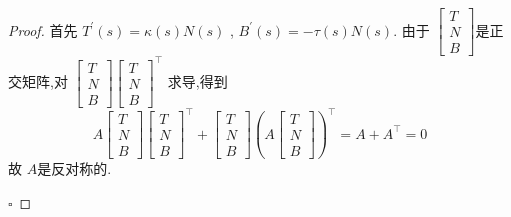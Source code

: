 \documentclass[../../古典微分几何.tex]{subfiles}
\begin{document}
\begin{proof}
    首先 \(   T^{\prime} \left( s \right)     =   \kappa  \left( s \right)N\left( s \right)  \) ,
    \(  B^{\prime} \left( s \right)=  -\tau \left( s \right)N\left( s \right)    \). 
    由于 \(\begin{bmatrix} 
        T\\ 
         N\\ 
          B 
    \end{bmatrix} \)是正交矩阵,对 \(  \begin{bmatrix} 
        T\\ 
         N\\ 
          B 
    \end{bmatrix} \begin{bmatrix} 
        T\\ 
         N\\ 
          B 
    \end{bmatrix}^{\top}    \) 求导,得到 \[
    A \begin{bmatrix} 
        T\\ 
         N\\ 
          B 
    \end{bmatrix} \begin{bmatrix} 
        T\\ 
         N\\ 
          B 
    \end{bmatrix}^{\top} +  \begin{bmatrix} 
        T\\ 
         N\\ 
          B 
    \end{bmatrix} \left(  A \begin{bmatrix} 
        T\\ 
         N\\ 
          B 
    \end{bmatrix}  \right) ^{\top} =  A+  A^{\top}= 0    
    \]故 \(  A  \)是反对称的. 

    \hfill $\square$
\end{proof}
\end{document}
